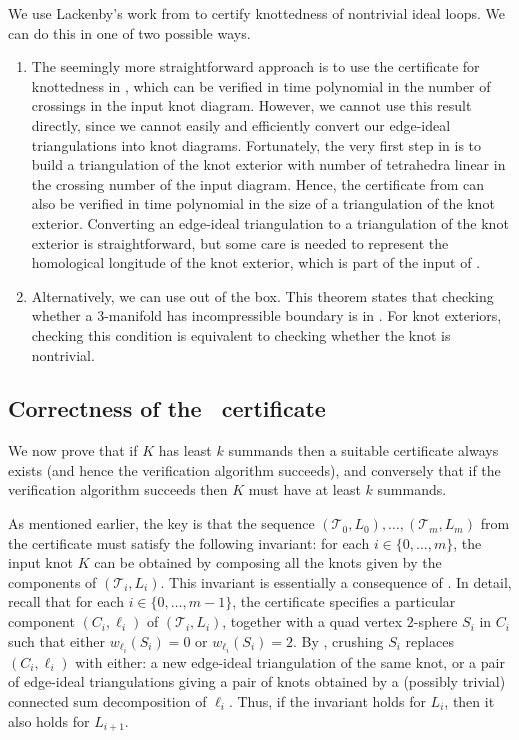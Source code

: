\documentclass[10pt,a4paper]{amsart}
\newcommand{\tri}{\mathcal{T}}
\begin{document}
We use Lackenby's work from \cite{lackenby2016efficient} to certify knottedness of nontrivial ideal loops. We can do this in one of two possible ways.
%
\begin{enumerate}
    \item The seemingly more straightforward approach is to use the certificate for knottedness in \cite[Theorems~1.1 and~1.5]{lackenby2016efficient},
    which can be verified in time polynomial in the number of crossings in the input knot diagram.
    However, we cannot use this result directly, since we cannot easily and efficiently convert our edge-ideal triangulations into knot diagrams.
    Fortunately, the very first step in \cite{lackenby2016efficient} is to build a triangulation of the knot exterior with number of tetrahedra linear in the crossing number of the input diagram.
    Hence, the certificate from \cite{lackenby2016efficient} can also be verified in time polynomial in the size of a triangulation of the knot exterior.
    Converting an edge-ideal triangulation to a triangulation of the knot exterior is straightforward,
    but some care is needed to represent the homological longitude of the knot exterior, which is part of the input of \cite[Theorem~1.5]{lackenby2016efficient}.
    \item Alternatively, we can use \cite[Theorem~1.7]{lackenby2016efficient} out of the box.
    This theorem states that checking whether a $3$-manifold has incompressible boundary is in {\NP}.
    For knot exteriors, checking this condition is equivalent to checking whether the knot is nontrivial.
\end{enumerate}

\subsection{Correctness of the \NP\ certificate}\label{ssec:proofNP}

We now prove that if $K$ has least $k$ summands then a suitable certificate always exists (and hence the verification algorithm succeeds),
and conversely that if the verification algorithm succeeds then $K$ must have at least $k$ summands.

As mentioned earlier, the key is that the sequence $(\tri_0,L_0),\ldots,(\tri_m,L_m)$ from the certificate must satisfy the following invariant:
for each $i\in \{0,\ldots,m\}$, the input knot $K$ can be obtained by composing all the knots given by the components of $(\tri_i,L_i)$.
This invariant is essentially a consequence of .
In detail, recall that for each $i\in \{0,\ldots,m-1\}$, the certificate specifies a particular component $(C_i,\ell_i)$ of $(\tri_i,L_i)$,
together with a quad vertex $2$-sphere $S_i$ in $C_i$ such that either $w_{\ell_i}(S_i)=0$ or $w_{\ell_i}(S_i)=2$.
By , crushing $S_i$ replaces $(C_i,\ell_i)$ with either:
a new edge-ideal triangulation of the same knot, or a pair of edge-ideal triangulations giving a pair of knots obtained by a (possibly trivial) connected sum decomposition of $\ell_i$.
Thus, if the invariant holds for $L_i$, then it also holds for $L_{i+1}$.
\end{document}
